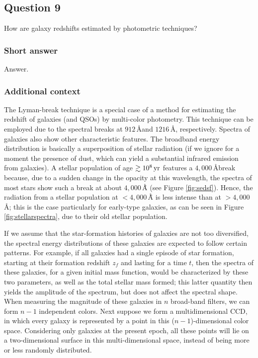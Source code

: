 \documentclass[a4paper,11pt]{article}
\begin{document}

\newpage
\subsection{Question 9}

How are galaxy redshifts estimated by photometric techniques?

\subsubsection{Short answer}

Answer.

\subsubsection{Additional context}

The Lyman-break technique is a special case of a method for estimating the redshift of galaxies (and QSOs) by multi-color photometry. This technique can be employed due to the spectral breaks at $912\,$\AA and $1216\,$\AA, respectively. Spectra of galaxies also show other characteristic features. The broadband energy distribution is basically a superposition of stellar radiation (if we ignore for a moment the presence of dust, which can yield a substantial infrared emission from galaxies). A stellar population of age $\gtrsim10^8\,{\rm yr}$ features a $4,000\,$\AA break because, due to a sudden change in the opacity at this wavelength, the spectra of most stars show such a break at about $4,000\,$\AÅ (see Figure \ref{fig:sedsf}). Hence, the radiation from a stellar population at $<4,000\,$\AÅ is less intense than at $>4,000\,$\AA; this is the case particularly for early-type galaxies, as can be seen in Figure \ref{fig:stellarspectra}, due to their old stellar population.

{\noindent}If we assume that the star-formation histories of galaxies are not too diversified, the spectral energy distributions of these galaxies are expected to follow certain patterns. For example, if all galaxies had a single episode of star formation, starting at their formation redshift $z_f$ and lasting for a time $t$, then the spectra of these galaxies, for a given initial mass function, would be characterized by these two parameters, as well as the total stellar mass formed; this latter quantity then yields the amplitude of the spectrum, but does not affect the spectral shape. When measuring the magnitude of these galaxies in $n$ broad-band filters, we can form $n-1$ independent colors. Next suppose we form a multidimensional CCD, in which every galaxy is represented by a point in this ($n-1$)-dimensional color space. Considering only galaxies at the present epoch, all these points will lie on a two-dimensional surface in this multi-dimensional space, instead of being more or less randomly distributed.
\end{document}

